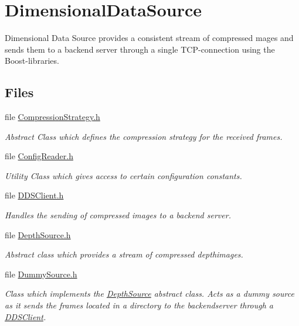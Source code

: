 \hypertarget{group___dimensional_data_source}{\section{Dimensional\+Data\+Source}
\label{group___dimensional_data_source}
}


Dimensional Data Source provides a consistent stream of compressed mages and sends them to a backend server through a single T\+C\+P-\/connection using the Boost-\/libraries.  


\subsection*{Files}
\begin{DoxyCompactItemize}
\item 
file \hyperlink{_compression_strategy_8h}{Compression\+Strategy.\+h}
\begin{DoxyCompactList}\small\item\em Abstract Class which defines the compression strategy for the received frames. \end{DoxyCompactList}\item 
file \hyperlink{_config_reader_8h}{Config\+Reader.\+h}
\begin{DoxyCompactList}\small\item\em Utility Class which gives access to certain configuration constants. \end{DoxyCompactList}\item 
file \hyperlink{_d_d_s_client_8h}{D\+D\+S\+Client.\+h}
\begin{DoxyCompactList}\small\item\em Handles the sending of compressed images to a backend server. \end{DoxyCompactList}\item 
file \hyperlink{_depth_source_8h}{Depth\+Source.\+h}
\begin{DoxyCompactList}\small\item\em Abstract class which provides a stream of compressed depthimages. \end{DoxyCompactList}\item 
file \hyperlink{_dummy_source_8h}{Dummy\+Source.\+h}
\begin{DoxyCompactList}\small\item\em Class which implements the \hyperlink{class_depth_source}{Depth\+Source} abstract class. Acts as a dummy source as it sends the frames located in a directory to the backendserver through a \hyperlink{class_d_d_s_client}{D\+D\+S\+Client}. \end{DoxyCompactList}\item 

\end{DoxyCompactItemize}
